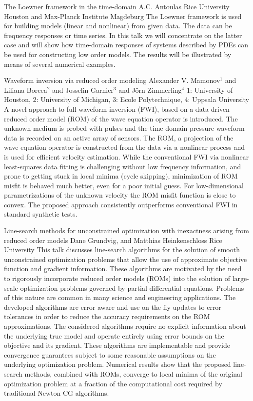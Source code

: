 \vspace{1.5ex}
\abs
{The Loewner framework in the time-domain}
{A.C. Antoulas}
{Rice University Houston and Max-Planck Institute Magdeburg}
{The Loewner framework is used for building models (linear and nonlinear) from given data.
The data can be frequency responses or time series. In this talk we will concentrate on the latter case
and will show how time-domain responses of systems described by PDEs can be used for constructing
low order models. The results will be illustrated by means of several numerical examples.}


\vspace{1.5ex}
\abs
{Waveform inversion via reduced order modeling}
{Alexander V. Mamonov$^{1}$ and Liliana Borcea$^{2}$ and Josselin Garnier$^{3}$ and J\"{o}rn Zimmerling$^{4}$}
{1: University of Houston, 2: University of Michigan, 3: Ecole Polytechnique, 4: Uppsala University}
{A novel approach to full waveform inversion (FWI), based on a data driven reduced order model (ROM) of the wave equation operator is introduced. The unknown medium is probed with pulses and the time domain pressure waveform data is recorded on an active array of sensors. The ROM, a projection of the wave equation operator is constructed from the data via a nonlinear process and is used for efficient velocity estimation. While the conventional FWI via nonlinear least-squares data fitting is challenging without low frequency information, and prone to getting stuck in local minima (cycle skipping), minimization of ROM misfit is behaved much better, even for a poor initial guess. For low-dimensional parametrizations of the unknown velocity the ROM misfit function is close to convex. The proposed approach consistently outperforms conventional FWI in standard synthetic tests.}


\vspace{1.5ex}
\abs
{Line-search methods for unconstrained optimization with inexactness arising from reduced order models}
{Dane Grundvig, and Matthias Heinkenschloss}
{Rice University}
{This talk discusses line-search algorithms for the solution of smooth unconstrained optimization problems that allow the use of approximate objective function and gradient information. These algorithms are motivated by the need to rigorously incorporate reduced order models (ROMs) into the solution of large-scale optimization problems governed by partial differential equations. Problems of this nature are common in many science and engineering applications. The developed algorithms are error aware and use on the fly updates to error tolerances in order to reduce the accuracy requirements on the ROM approximations. The considered algorithms require no explicit information about the underlying true model and operate entirely using error bounds on the objective and its gradient. These algorithms are implementable and provide convergence guarantees subject to some reasonable assumptions on the underlying optimization problem. Numerical results show that the proposed line-search methods, combined with ROMs, converge to local minima of the original optimization problem at a fraction of the computational cost required by traditional Newton CG algorithms.}


